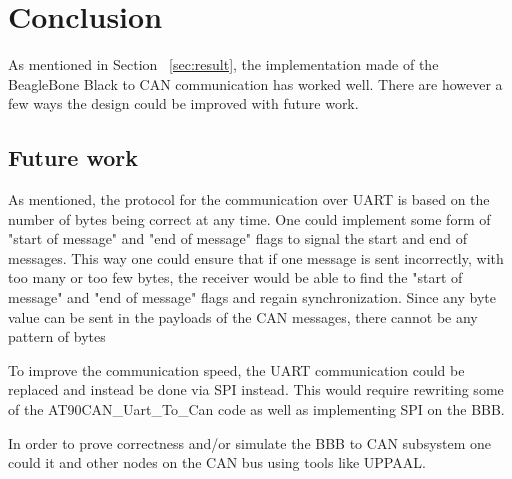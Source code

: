 
\section{Conclusion}\label{sec:conclusion}
As mentioned in Section ~\ref{sec:result}, the implementation made of the BeagleBone Black to CAN communication has worked well. There are however a few ways the design could be improved with future work.

\subsection{Future work}
As mentioned, the protocol for the communication over UART is based on the number of bytes being correct at any time. One could implement some form of "start of message" and "end of message" flags to signal the start and end of messages. This way one could ensure that if one message is sent incorrectly, with too many or too few bytes, the receiver would be able to find the "start of message" and "end of message" flags and regain synchronization. \newline
Since any byte value can be sent in the payloads of the CAN messages,  there cannot be any pattern of bytes 

To improve the communication speed, the UART communication could be replaced and instead be done via SPI instead. This would require rewriting some of the AT90CAN\_Uart\_To\_Can code as well as implementing SPI on the BBB. 

In order to prove correctness and/or simulate the BBB to CAN subsystem one could it and other nodes on the CAN bus using tools like UPPAAL.

